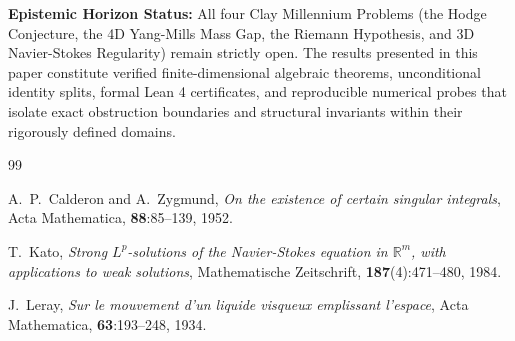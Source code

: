 \documentclass[11pt,a4paper]{article}
\theoremstyle{definition}
\begin{document}
\vspace{0.5em}
\noindent\textbf{Epistemic Horizon Status:} All four Clay Millennium Problems (the Hodge Conjecture, the 4D Yang-Mills Mass Gap, the Riemann Hypothesis, and 3D Navier-Stokes Regularity) remain strictly open. The results presented in this paper constitute verified finite-dimensional algebraic theorems, unconditional identity splits, formal Lean 4 certificates, and reproducible numerical probes that isolate exact obstruction boundaries and structural invariants within their rigorously defined domains.

\begin{thebibliography}{99}

A.~P.~Calderon and A.~Zygmund,
\textit{On the existence of certain singular integrals},
Acta Mathematica, \textbf{88}:85--139, 1952.

T.~Kato,
\textit{Strong $L^p$-solutions of the Navier-Stokes equation in $\mathbb{R}^m$, with applications to weak solutions},
Mathematische Zeitschrift, \textbf{187}(4):471--480, 1984.

J.~Leray,
\textit{Sur le mouvement d'un liquide visqueux emplissant l'espace},
Acta Mathematica, \textbf{63}:193--248, 1934.

\end{thebibliography}
\end{document}
